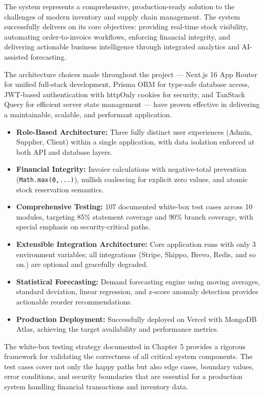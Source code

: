 ﻿\documentclass[12pt,a4paper]{report}
\begin{document}
The system represents a comprehensive, production-ready solution to the challenges of modern inventory and supply chain management. The system successfully delivers on its core objectives: providing real-time stock visibility, automating order-to-invoice workflows, enforcing financial integrity, and delivering actionable business intelligence through integrated analytics and AI-assisted forecasting.

The architecture choices made throughout the project --- Next.js 16 App Router for unified full-stack development, Prisma ORM for type-safe database access, JWT-based authentication with httpOnly cookies for security, and TanStack Query for efficient server state management --- have proven effective in delivering a maintainable, scalable, and performant application.

\begin{tcolorbox}[successbox,title={Key Achievements}]
\begin{itemize}[leftmargin=1.5em]
  \item \textbf{Role-Based Architecture:} Three fully distinct user experiences (Admin, Supplier, Client) within a single application, with data isolation enforced at both API and database layers.
  \item \textbf{Financial Integrity:} Invoice calculations with negative-total prevention (\texttt{Math.max(0,...)}), nullish coalescing for explicit zero values, and atomic stock reservation semantics.
  \item \textbf{Comprehensive Testing:} 107 documented white-box test cases across 10 modules, targeting 85\% statement coverage and 90\% branch coverage, with special emphasis on security-critical paths.
  \item \textbf{Extensible Integration Architecture:} Core application runs with only 3 environment variables; all integrations (Stripe, Shippo, Brevo, Redis, and so on.) are optional and gracefully degraded.
  \item \textbf{Statistical Forecasting:} Demand forecasting engine using moving averages, standard deviation, linear regression, and z-score anomaly detection provides actionable reorder recommendations.
  \item \textbf{Production Deployment:} Successfully deployed on Vercel with MongoDB Atlas, achieving the target availability and performance metrics.
\end{itemize}
\end{tcolorbox}

The white-box testing strategy documented in Chapter 5 provides a rigorous framework for validating the correctness of all critical system components. The test cases cover not only the happy paths but also edge cases, boundary values, error conditions, and security boundaries that are essential for a production system handling financial transactions and inventory data.
\end{document}
